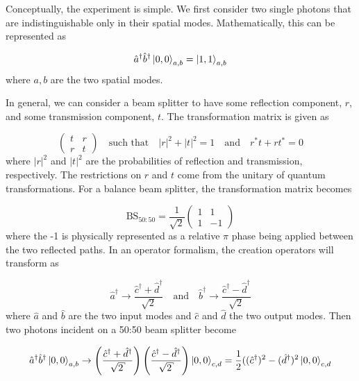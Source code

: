 Conceptually, the experiment is simple. We first consider two single photons that are indistinguishable only in their spatial modes. Mathematically, this can be represented as 

\begin{equation}
	\hat{a}^\dagger \hat{b}^\dagger \ket{0,0}_{a,b} = \ket{1,1}_{a,b}
\end{equation}
where $a,b$ are the two spatial modes.

In general, we can consider a beam splitter to have some reflection component, $r$, and some transmission component, $t$. The transformation matrix is given as 

\begin{equation}
	\left(
	\begin{matrix}
		t & r \\
		r & t
	\end{matrix}
	\right)
	\quad\text{such that}\quad
	|r|^2 + |t|^2 = 1 
	\quad\text{and}\quad
	r^\ast t + r t^\ast = 0
\end{equation}
where $|r|^2$ and $|t|^2$ are the probabilities of reflection and transmission, respectively. The restrictions on $r$ and $t$ come from the unitary of quantum transformations. For a balance beam splitter, the transformation matrix becomes

\begin{equation}
	\text{BS}_{50:50} = \frac{1}{\sqrt{2}}
	\left(
	\begin{matrix}
		1 & 1 \\
		1 & -1
	\end{matrix}
	\right)	
\end{equation}
where the {-1} is physically represented as a relative $\pi$ phase being applied between the two reflected paths. In an operator formalism, the creation operators will transform as

\begin{equation}
	\hat{a}^\dagger \rightarrow \frac{\hat{c}^\dagger + \hat{d}^\dagger}{\sqrt{2}} \quad \text{and} \quad \hat{b}^\dagger \rightarrow \frac{\hat{c}^\dagger - \hat{d}^\dagger}{\sqrt{2}}
\end{equation}
where $\hat{a}$ and $\hat{b}$ are the two input modes and $\hat{c}$ and $\hat{d}$ the two output modes. Then two photons incident on a {50:50} beam splitter become

\begin{equation}
	\hat{a}^\dagger \hat{b}^\dagger \ket{0,0}_{a,b} \rightarrow \left( \frac{\hat{c}^\dagger + \hat{d}^\dagger}{\sqrt{2}} \right)  \left( \frac{\hat{c}^\dagger - \hat{d}^\dagger}{\sqrt{2}} \right)  \ket{0,0}_{c,d} = \frac{1}{2}((\hat{c}^\dagger)^2 - (\hat{d}^\dagger)^2 \ket{0,0}_{c,d}
\end{equation}

